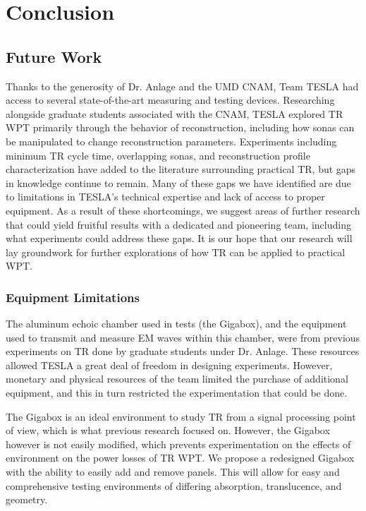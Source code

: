 \chapter{Conclusion}

\label{ch:conclusion}


\section{Future Work}


Thanks to the generosity of Dr. Anlage and the UMD CNAM, Team TESLA had access to several state-of-the-art measuring and testing devices. Researching alongside graduate students associated with the CNAM, TESLA explored TR WPT primarily through the behavior of reconstruction, including how sonas can be manipulated to change reconstruction parameters.  Experiments including minimum TR cycle time, overlapping sonas, and reconstruction profile characterization have added to the literature surrounding practical TR, but gaps in knowledge continue to remain.  Many of these gaps we have identified are due to limitations in TESLA's technical expertise and lack of  access to proper equipment.  As a result of these shortcomings, we suggest areas of further research that could yield fruitful results with a dedicated and pioneering team, including what experiments could address these gaps.  It is our hope that our research will lay groundwork for further explorations of how TR can be applied to practical WPT.

\subsection{Equipment Limitations}

The aluminum echoic chamber used in tests (the Gigabox), and the equipment used to transmit and measure EM waves within this chamber, were from previous experiments on TR done by graduate students under Dr. Anlage.  These resources allowed TESLA a great deal of freedom in designing experiments.  However, monetary and physical resources of the team limited the purchase of additional equipment, and this in turn restricted the experimentation that could be done.

The Gigabox is an ideal environment to study TR from a signal processing point of view, which is what previous research focused on. However, the Gigabox however is not easily modified, which prevents experimentation on the effects of environment on the power losses of TR WPT.  We propose a redesigned Gigabox with the ability to easily add and remove panels.  This will allow for easy and comprehensive testing environments of differing absorption, translucence, and geometry.

